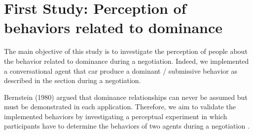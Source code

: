 \documentclass{article}
\begin{document}
		\title{\vskip -10pt}
		\section{First Study: Perception of behaviors related to dominance}
The main objective of this study is to investigate the perception of people about the behavior related to dominance during a negotiation. Indeed, we implemented a conversational agent that car produce a dominant / submissive behavior as described in the section  during a negotiation. 

Bernstein (1980) argued that dominance relationships can never be assumed but must be demonstrated in each application. Therefore, we aim to validate the implemented behaviors by investigating a perceptual experiment in which participants have to determine the behaviors of two agents during a negotiation . 
	
\end{document}
